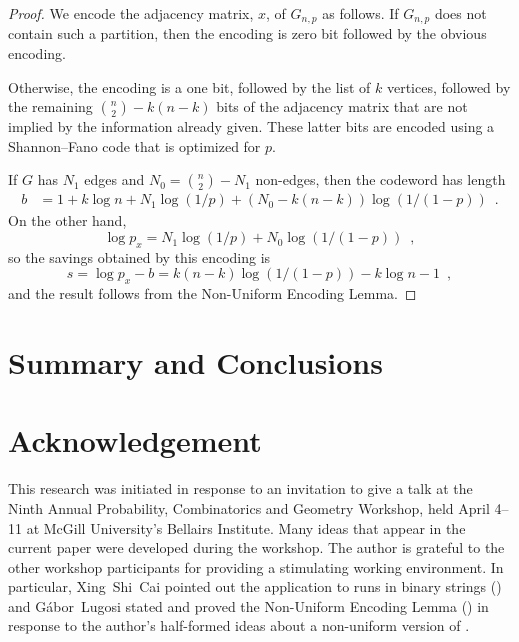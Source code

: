 \documentclass{patmorin}
\begin{document}
\begin{proof}
  We encode the adjacency matrix, $x$, of $G_{n,p}$ as follows.
  If $G_{n,p}$ does not contain such a partition, then the encoding is
  zero bit followed by the obvious encoding.

  Otherwise, the encoding is a one bit, followed by the list of $k$
  vertices, followed by the remaining $\binom{n}{2}-k(n-k)$ bits of the
  adjacency matrix that are not implied by the information already given.
  These latter bits are encoded using a Shannon--Fano code that is
  optimized for $p$.

  If $G$ has $N_1$ edges and $N_0=\binom{n}{2}-N_1$ non-edges, then the codeword has length
  \begin{align*}
      b & = 1 + k\log n + N_1\log(1/p) + (N_0-k(n-k))\log(1/(1-p)) \enspace .
  \end{align*}
  On the other hand,
  \[
      \log p_x = N_1\log(1/p) + N_0\log(1/(1-p)) \enspace ,
  \]
  so the savings obtained by this encoding is 
  \[
      s = \log p_x - b = k(n-k)\log(1/(1-p)) - k\log n - 1 \enspace ,
  \]
  and the result follows from the Non-Uniform Encoding Lemma.
\end{proof}




\subsection{}




\section{Summary and Conclusions}


\section*{Acknowledgement}

This research was initiated in response to an invitation to give
a talk at the Ninth Annual Probability, Combinatorics and Geometry
Workshop, held April 4--11 at McGill University's Bellairs Institute.
Many ideas that appear in the current paper were developed during the
workshop. The author is grateful to the other workshop participants for
providing a stimulating working environment.  In particular, Xing~Shi~Cai
pointed out the application to runs in binary strings ()
and G\'abor~Lugosi stated and proved the Non-Uniform Encoding Lemma
() in response to the author's half-formed ideas about a
non-uniform version of .



\end{document}
